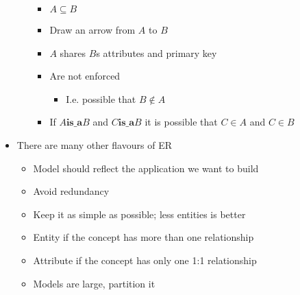 \begin{itemize}
\begin{itemize}
                \begin{itemize}
                    \item $A \subseteq B$
                    \item Draw an arrow from $A$ to $B$
                    \item $A$ shares $B$s attributes and primary key
                    \item Are not enforced
                        \begin{itemize}
                            \item I.e. possible that $B \not\in A$
                        \end{itemize}
                    \item If $A \textbf{is\_a} B$ and $C \textbf{is\_a} B$ it is possible that $C \in A$ and $C \in B$
                \end{itemize}
        \end{itemize}
    \item There are many other flavours of ER
        \begin{itemize}
            \item Model should reflect the application we want to build
            \item Avoid redundancy
            \item Keep it as simple as possible; less entities is better
            \item Entity if the concept has more than one relationship
            \item Attribute if the concept has only one 1:1 relationship
            \item Models are large, partition it
        \end{itemize}
\end{itemize}

